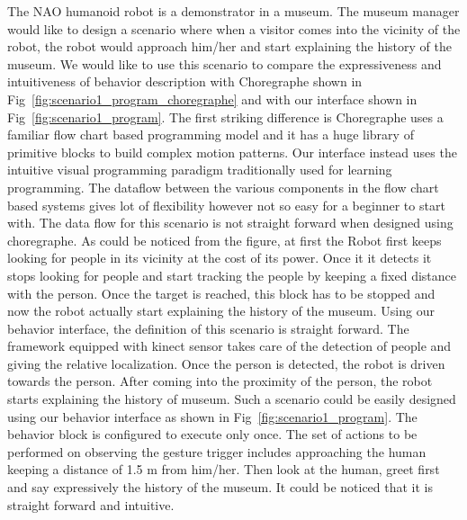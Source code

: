 \documentclass{llncs}
\begin{document}
%
The NAO humanoid robot is a demonstrator in a museum. The museum manager would like to design a scenario where when a visitor comes into the vicinity of the robot, the robot would approach him/her and start explaining the history of the museum. We would like to use this scenario to compare the expressiveness and intuitiveness of behavior description with Choregraphe \cite{NaoRobot} shown in Fig~\ref{fig:scenario1_program_choregraphe} and with our interface shown in Fig~\ref{fig:scenario1_program}. The first striking difference is Choregraphe uses a familiar flow chart based programming model and it has a huge library of primitive blocks to build complex motion patterns. Our interface instead uses the intuitive visual programming paradigm traditionally used for learning programming. The dataflow between the various components in the flow chart based systems gives lot of flexibility however not so easy for a beginner to start with. 
	The data flow for this scenario is not straight forward when designed using choregraphe. As could be noticed from the figure, at first the Robot first keeps looking for people in its vicinity at the cost of its power. Once it it detects it stops looking for people and start tracking the people by keeping a fixed distance with the person. Once the target is reached, this block has to be stopped and now the robot actually start explaining the history of the museum.
	Using our behavior interface, the definition of this scenario is straight forward. The framework equipped with kinect sensor takes care of the detection of people and giving the relative localization. Once the person is detected, the robot is driven towards the person. After coming into the proximity of the person, the robot starts explaining the history of museum.
 Such a scenario could be easily designed using our behavior interface as shown in Fig~\ref{fig:scenario1_program}. The behavior block is configured to execute only once. The set of actions to be performed on observing the gesture trigger includes approaching the human keeping a distance of 1.5 m from him/her. Then look at the human, greet first and say expressively the  history of the museum. It could be noticed that it is straight forward and intuitive.%
\end{document}
